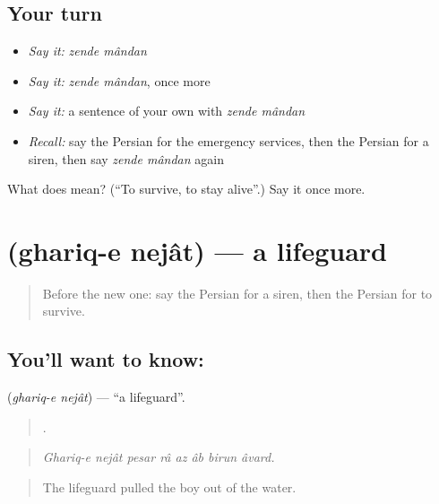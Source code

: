 \subsection*{Your turn}
\begin{itemize}
\raggedright
  \item \emph{Say it:} \emph{zende mândan}
  \item \emph{Say it:} \emph{zende mândan}, once more
  \item \emph{Say it:} a sentence of your own with \emph{zende mândan}
  \item \emph{Recall:} say the Persian for the emergency services, then the Persian for a siren, then say \emph{zende mândan} again
\end{itemize}

\begin{tcolorbox}[breakable,colback=teal!4,colframe=teal!35!black,title={Before you move on}]
What does   mean? (\textquotedblleft{}To survive, to stay alive\textquotedblright{}.) Say it once more.
\end{tcolorbox}
\section[\texorpdfstring{\fa{غریق} \fa{نجات} (ghariq-e nejât)}{غریق نجات (ghariq-e nejât)}]{  (ghariq-e nejât) — a lifeguard}

\label{lesson:FA-C327-ghariq-e-nejat}



\begin{quote}
Before the new one: say the Persian for a siren, then the Persian for to survive.
\end{quote}

\subsection*{You'll want to know:  }
\textbf{ } (\emph{ghariq-e nejât}) — \textquotedblleft{}a lifeguard\textquotedblright{}.

\begin{quote}
       .
\end{quote}

\begin{quote}
\emph{Ghariq-e nejât pesar râ az âb birun âvard.}
\end{quote}

\begin{quote}
The lifeguard pulled the boy out of the water.
\end{quote}

